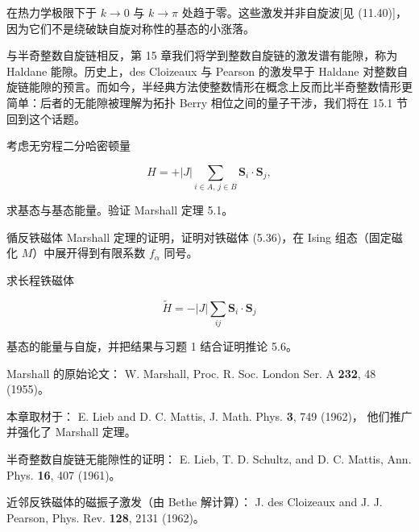 在热力学极限下于 $k \rightarrow 0$ 与 $k \rightarrow \pi$ 处趋于零。这些激发并非自旋波[见 (11.40)]，因为它们不是绕破缺自旋对称性的基态的小涨落。

与半奇整数自旋链相反，第 15 章我们将学到整数自旋链的激发谱有能隙，称为 Haldane 能隙。历史上，des Cloizeaux 与 Pearson 的激发早于 Haldane 对整数自旋链能隙的预言。而如今，半经典方法使整数情形在概念上反而比半奇整数情形更简单：后者的无能隙被理解为拓扑 Berry 相位之间的量子干涉，我们将在 15.1 节回到这个话题。

\begin{exercises}

\item 考虑无穷程二分哈密顿量

\begin{equation*}
H = + | J | \sum_ {i \in A,\, j \in B} \mathbf {S} _ {i} \cdot \mathbf {S} _ {j} ,
\tag{5.57}
\end{equation*}

求基态与基态能量。验证 Marshall 定理 5.1。

\item 循反铁磁体 Marshall 定理的证明，证明对铁磁体 (5.36)，在 Ising 组态（固定磁化 $M$）中展开得到有限系数 $f_{\alpha}$ 同号。

\item 求长程铁磁体

\begin{equation*}
\tilde {H} = - | J | \sum_ {ij} \mathbf {S} _ {i} \cdot \mathbf {S} _ {j}
\tag{5.58}
\end{equation*}

基态的能量与自旋，并把结果与习题 1 结合证明推论 5.6。

\end{exercises}

\begin{chapbib}
\item Marshall 的原始论文：
  W. Marshall, Proc. R. Soc. London Ser. A \textbf{232}, 48 (1955)。
\item 本章取材于：
  E. Lieb and D. C. Mattis, J. Math. Phys. \textbf{3}, 749 (1962)，
  他们推广并强化了 Marshall 定理。
\item 半奇整数自旋链无能隙性的证明：
  E. Lieb, T. D. Schultz, and D. C. Mattis, Ann. Phys. \textbf{16}, 407 (1961)。
\item 近邻反铁磁体的磁振子激发（由 Bethe 解计算）：
  J. des Cloizeaux and J. J. Pearson, Phys. Rev. \textbf{128}, 2131 (1962)。
\end{chapbib}
